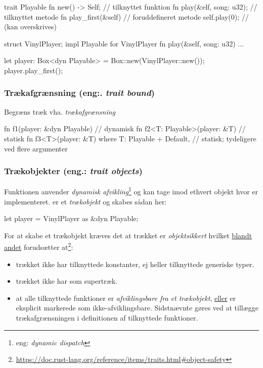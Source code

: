 \documentclass{article}
\begin{document}
\begin{rustcode}
trait Playable {
    fn new() -> Self;         // tilknyttet funktion
    fn play(&elf, song: u32); // tilknyttet metode
    fn play_first(&self) {    // foruddefineret metode
        self.play(0);         // (kan overskrives)
    }
}

struct VinylPlayer;
impl Playable for VinylPlayer {
    fn play(&self, song: u32) {}
    ...
}

let player: Box<dyn Playable> = Box::new(VinylPlayer::new());
player.play_first();
\end{rustcode}


\subsubsection*{Trækafgrænsning (eng:. \emph{trait bound})}
Begræns træk vha. \emph{trækafgrænsning}

\begin{rustcode}
fn f1(player: &dyn Playable) {}   // dynamisk
fn f2<T: Playable>(player: &T) {} // statisk
fn f3<T>(player: &T)
where
    T: Playable + Default,
{} // statisk; tydeligere ved flere argumenter
\end{rustcode}

\subsubsection*{Trækobjekter (eng.: \emph{trait objects})}

Funktionen  anvender \emph{dynamisk afvikling}\footnote{eng: \emph{dynamic dispatch}} og kan tage imod ethvert objekt hvor  er implementeret.  er et \emph{trækobjekt} og skabes sådan her:
\begin{rustcode}
let player = VinylPlayer as &dyn Playable;
\end{rustcode}

For at skabe et trækobjekt kræves det at trækket er \emph{objektsikkert} hvilket \underline{blandt andet} forudsætter at\footnote{\url{https://doc.rust-lang.org/reference/items/traits.html\#object-safety}}:
\begin{itemize}
    \item trækket ikke har tilknyttede konstanter, ej heller tilknyttede generiske typer.
    \item trækket ikke har  som supertræk.
    \item at alle tilknyttede funktioner er \emph{afviklingsbare fra et trækobjekt}, \underline{eller} er eksplicit markerede som ikke-afviklingsbare. Sidstnævnte gøres ved at tillægge
    trækafgrænsningen 
    i definitionen af tilknyttede funktioner.
\end{itemize}
\end{document}

